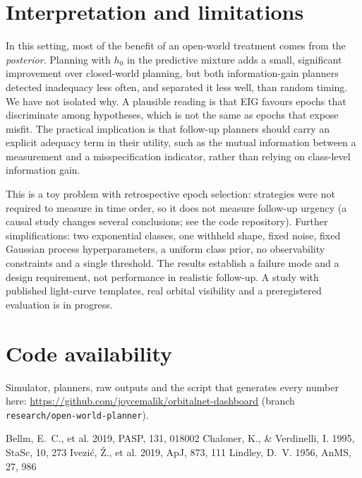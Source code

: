 \documentclass{aastex701}
\begin{document}
\begin{table}[h]
\centering
\caption{Pooled outcomes (percent, 95\% Wilson interval). ``Post hoc'': measurements chosen without $h_0$, scored with the open-world posterior.}
\label{tab:res}
\scriptsize

\end{table}

\section{Interpretation and limitations}
In this setting, most of the benefit of an open-world treatment comes from the \emph{posterior}. Planning with $h_0$ in the predictive mixture adds a small, significant improvement over closed-world planning, but both information-gain planners detected inadequacy less often, and separated it less well, than random timing. We have not isolated why. A plausible reading is that EIG favours epochs that discriminate among hypotheses, which is not the same as epochs that expose misfit. The practical implication is that follow-up planners should carry an explicit adequacy term in their utility, such as the mutual information between a measurement and a misspecification indicator, rather than relying on class-level information gain.

This is a toy problem with retrospective epoch selection: strategies were not required to measure in time order, so it does not measure follow-up urgency (a causal study changes several conclusions; see the code repository). Further simplifications: two exponential classes, one withheld shape, fixed noise, fixed Gaussian process hyperparameters, a uniform class prior, no observability constraints and a single threshold. The results establish a failure mode and a design requirement, not performance in realistic follow-up. A study with published light-curve templates, real orbital visibility and a preregistered evaluation is in progress.

\section*{Code availability}
Simulator, planners, raw outputs and the script that generates every number here: \url{https://github.com/joycemalik/orbitalnet-dashboard} (branch \texttt{research/open-world-planner}).

\begin{thebibliography}{}
 Bellm, E.~C., et al. 2019, PASP, 131, 018002
 Chaloner, K., \& Verdinelli, I. 1995, StaSc, 10, 273
 Ivezi\'c, \v{Z}., et al. 2019, ApJ, 873, 111
 Lindley, D.~V. 1956, AnMS, 27, 986
\end{thebibliography}
\end{document}
